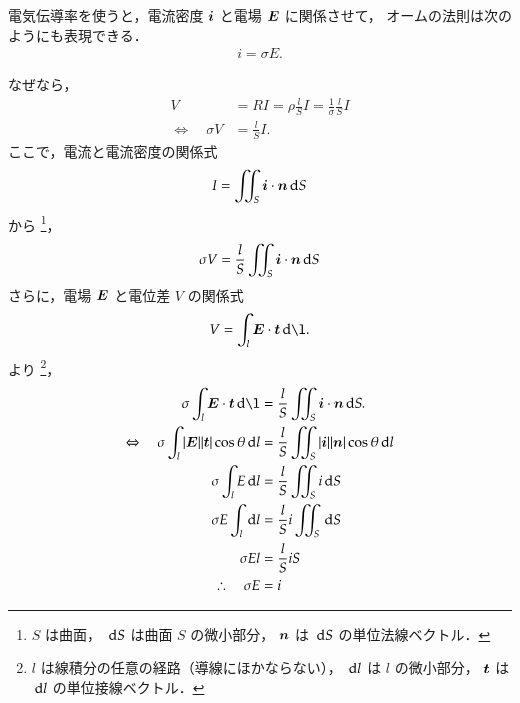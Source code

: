             電気伝導率を使うと，電流密度 $\boldsymbol{i}$ と電場 $\boldsymbol{E}$ に関係させて，
            オームの法則は次のようにも表現できる．
            \begin{align}
                i=\sigma E.
            \end{align}

            なぜなら，
            \begin{align*}
                V &= RI=\rho\frac{l}{S}I=\frac{1}{\sigma}\frac{l}{S}I \\
                \Leftrightarrow \quad
                \sigma V &= \frac{l}{S}I.
            \end{align*}
            ここで，電流と電流密度の関係式
            \begin{equation*}
                I = \int\mspace{-11mu}\int_{S} \boldsymbol{i} \cdot \boldsymbol{n} \,\mathrm{d} S
            \end{equation*}
            から
                \footnote{
                    $S$ は曲面，
                    $\,\mathrm{d} S$ は曲面 $S$ の微小部分，
                    $\boldsymbol{n}$ は $\,\mathrm{d} S$ の単位法線ベクトル．
                }，
            \begin{equation*}
                \sigma V = \frac{l}{S}\int\mspace{-11mu}\int_{S} \boldsymbol{i} \cdot \boldsymbol{n} \,\mathrm{d} S
            \end{equation*}
            さらに，電場 $\boldsymbol{E}$ と電位差 $V$ の関係式
            \begin{equation*}
                V=\int_{l} \bE \cdot \bt \df \l.
            \end{equation*}
            より
                \footnote{
                    $l$ は線積分の任意の経路（導線にほかならない），
                    $\,\mathrm{d} l$ は $l$ の微小部分，
                    $\boldsymbol{t}$ は $\,\mathrm{d} l$ の単位接線ベクトル．

                }，
            \begin{align*}
                     \sigma \int_{l} \bE \cdot \bt \df \l
                &=  \frac{l}{S}\sint_{S} \bi \cdot \bn \df S. \\
                \Leftrightarrow \quad
                     \sigma \int_{l} |\bE||\bt| \cos\theta \df l
                &=  \frac{l}{S}\sint_{S} |\bi||\bn|\cos\theta \df l \\
                     \sigma \int_{l} E\df l
                &=  \frac{l}{S}\sint_{S} i \df S \\
                     \sigma E  \int_{l} \df l
                &=  \frac{l}{S}i\sint_{S} \df S \\
                     \sigma  El
                &=  \frac{l}{S}iS \\
                \therefore \quad
                \sigma E &= i
            \end{align*}
